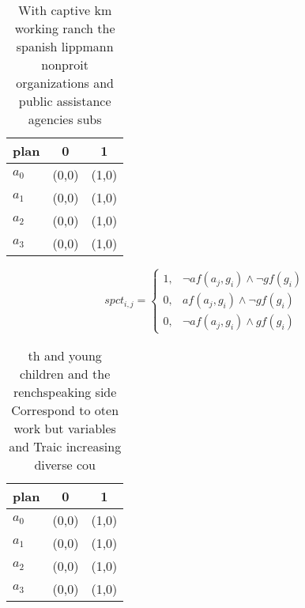 \documentclass[a4paper]{article}
\begin{document}
\begin{table}
\begin{adjustbox}{width=1\columnwidth}
\begin{tabular}{|l|l|l|}
\hline
\textbf{plan} & \multicolumn{1}{c|}{\textbf{0}} & \multicolumn{1}{c|}{\textbf{1}} \\ \hline
\textbf{$a_0$}  & (0,0) & (1,0) \\ \hline
\textbf{$a_1$}  & (0,0) & (1,0) \\ \hline
\textbf{$a_2$}  & (0,0) & (1,0) \\ \hline
\textbf{$a_3$}  & (0,0) & (1,0) \\ \hline
\end{tabular}
\end{adjustbox}
\caption{With captive km working ranch the spanish lippmann nonproit organizations and public assistance agencies subs
}
\end{table}

\begin{equation}
spct_{i,j} =
\begin{cases}
1, & \text{$\neg af(a_j,g_i) \wedge \neg gf(g_i)$}\\
0, & \text{$af(a_j,g_i) \wedge \neg gf(g_i)$}\\
0, & \text{$\neg af(a_j,g_i) \wedge gf(g_i)$}
\end{cases}
\end{equation}

\begin{table}
\begin{adjustbox}{width=0.9\columnwidth}
\begin{tabular}{|l|l|l|}
\hline
\textbf{plan} & \multicolumn{1}{c|}{\textbf{0}} & \multicolumn{1}{c|}{\textbf{1}} \\ \hline
\textbf{$a_0$}  & (0,0) & (1,0) \\ \hline
\textbf{$a_1$}  & (0,0) & (1,0) \\ \hline
\textbf{$a_2$}  & (0,0) & (1,0) \\ \hline
\textbf{$a_3$}  & (0,0) & (1,0) \\ \hline
\end{tabular}
\end{adjustbox}
\caption{th and young children and the renchspeaking side Correspond to oten work but variables and Traic increasing diverse cou
}
\end{table}
\end{document}

